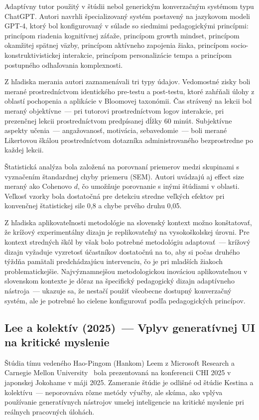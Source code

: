 Adaptívny tutor použitý v štúdii nebol generickým konverzačným systémom typu ChatGPT. Autori navrhli špecializovaný systém postavený na jazykovom modeli GPT-4, ktorý bol konfigurovaný v súlade so siedmimi pedagogickými princípmi: princípom riadenia kognitívnej záťaže, princípom growth mindset, princípom okamžitej spätnej väzby, princípom aktívneho zapojenia žiaka, princípom socio-konstruktivistickej interakcie, princípom personalizácie tempa a princípom postupného odhaľovania komplexnosti.

Z hľadiska merania autori zaznamenávali tri typy údajov. Vedomostné zisky boli merané prostredníctvom identického pre-testu a post-testu, ktoré zahŕňali úlohy z oblastí pochopenia a aplikácie v Bloomovej taxonómii. Čas strávený na lekcii bol meraný objektívne~--- pri tutorovi prostredníctvom logov interakcie, pri prezenčnej lekcii prostredníctvom predpísanej dĺžky 60 minút. Subjektívne aspekty učenia~--- angažovanosť, motivácia, sebavedomie~--- boli merané Likertovou škálou prostredníctvom dotazníka administrovaného bezprostredne po každej lekcii.

Štatistická analýza bola založená na porovnaní priemerov medzi skupinami s vyznačením štandardnej chyby priemeru (SEM). Autori uvádzajú aj effect size meraný ako Cohenovo $d$, čo umožňuje porovnanie s inými štúdiami v oblasti. Veľkosť vzorky bola dostatočná pre detekciu stredne veľkých efektov pri konvenčnej štatistickej sile 0,8 a chybe prvého druhu 0,05.

Z hľadiska aplikovateľnosti metodológie na slovenský kontext možno konštatovať, že krížový experimentálny dizajn je replikovateľný na vysokoškolskej úrovni. Pre kontext stredných škôl by však bolo potrebné metodológiu adaptovať~--- krížový dizajn vyžaduje vyzretosť účastníkov dostatočnú na to, aby si počas druhého týždňa pamätali predchádzajúcu intervenciu, čo je pri mladších žiakoch problematickejšie. Najvýznamnejšou metodologickou inováciou aplikovateľnou v slovenskom kontexte je dôraz na špecifický pedagogický dizajn adaptívneho nástroja~--- ukazuje sa, že nestačí použiť všeobecne dostupný konverzačný systém, ale je potrebné ho cielene konfigurovať podľa pedagogických princípov.


\subsection{Lee a kolektív (2025)~--- Vplyv generatívnej UI na kritické myslenie}

Štúdia tímu vedeného Hao-Pingom (Hankom) Leem z Microsoft Research a Carnegie Mellon University~\cite{lee2025genai} bola prezentovaná na konferencii CHI 2025 v japonskej Jokohame v máji 2025. Zameranie štúdie je odlišné od štúdie Kestina a kolektívu~--- neporovnáva rôzne metódy výučby, ale skúma, ako vplýva používanie generatívnych nástrojov umelej inteligencie na kritické myslenie pri reálnych pracovných úlohách.

